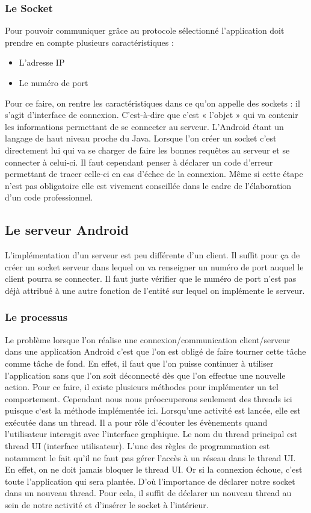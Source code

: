 \documentclass[a4paper,10pt]{article}
\begin{document}
\subsubsection{Le Socket}
Pour pouvoir communiquer grâce au protocole sélectionné l’application doit prendre en compte plusieurs caractéristiques :
\begin{itemize}
	\item L’adresse IP
	\item Le numéro de port
\end{itemize}
Pour ce faire, on rentre les caractéristiques dans ce qu’on appelle des sockets : il s’agit d’interface de connexion. C’est-à-dire que c’est « l’objet » qui va contenir les informations permettant de se connecter au serveur. L’Android étant un langage de haut niveau proche du Java. Lorsque l’on créer un socket c’est directement lui qui va se charger de faire les bonnes requêtes au serveur et se connecter à celui-ci. Il faut cependant penser à déclarer un code d’erreur permettant de tracer celle-ci en cas d’échec de la connexion. Même si cette étape n’est pas obligatoire elle est vivement conseillée dans le cadre de l’élaboration d’un code professionnel.
\subsection{Le serveur Android}
L’implémentation d’un serveur est peu différente d’un client. Il suffit pour ça de créer un socket serveur dans lequel on va renseigner un numéro de port auquel le client pourra se connecter. Il faut juste vérifier que le numéro de port n’est pas déjà attribué à une autre fonction de l’entité sur lequel on implémente le serveur.

\subsubsection{Le processus}
Le problème lorsque l’on réalise une connexion/communication client/serveur dans une application Android c’est que l’on est obligé de faire tourner cette tâche comme tâche de fond.  En effet, il faut que l’on puisse continuer à utiliser l’application sans que l’on soit déconnecté dès que l’on effectue une nouvelle action. Pour ce faire, il existe plusieurs méthodes pour implémenter un tel comportement. Cependant nous nous préoccuperons seulement des threads ici puisque c‘est la méthode implémentée ici. Lorsqu’une activité est lancée, elle est exécutée dans un thread. Il a pour rôle d’écouter les évènements quand l’utilisateur interagit avec l’interface graphique. Le nom du thread principal est thread UI (interface utilisateur). L’une des règles de programmation est notamment le fait qu’il ne faut pas gérer l’accès à un réseau dans le thread UI. En effet, on ne doit jamais bloquer le thread UI. Or si la connexion échoue, c’est toute l’application qui sera plantée. D’où l’importance de déclarer notre socket dans un nouveau thread. Pour cela, il suffit de déclarer un nouveau thread au sein de notre activité et d’insérer le socket à l’intérieur.
\end{document}
